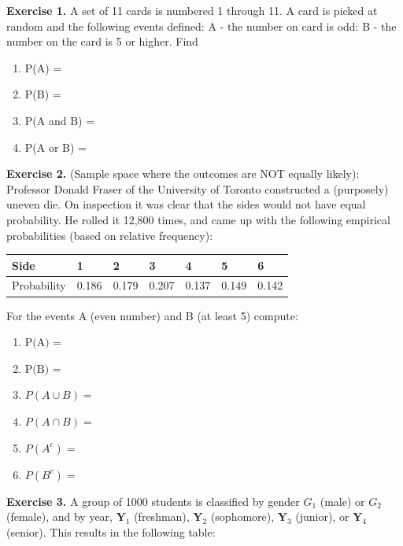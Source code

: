 \documentclass[
]{book}
\begin{document}
\textbf{Exercise 1.} A set of 11 cards is numbered 1 through 11. A card is picked at random and the following events defined: A - the number on card is odd: B - the number on the card is 5 or higher. Find

\begin{enumerate}
\def\labelenumi{\alph{enumi})}
\item
  P(A) =
\item
  P(B) =
\item
  P(A and B) =
\item
  P(A or B) =
\end{enumerate}

\textbf{Exercise 2.} (Sample space where the outcomes are NOT equally likely): Professor Donald Fraser of the University of Toronto constructed a (purposely) uneven die. On inspection it was clear that the sides would not have equal probability. He rolled it 12,800 times, and came up with the following empirical probabilities (based on relative frequency):

\begin{longtable}[]{@{}lllllll@{}}
\toprule\noalign{}
Side & 1 & 2 & 3 & 4 & 5 & 6 \\
\midrule\noalign{}
\endhead
\bottomrule\noalign{}
\endlastfoot
Probability & 0.186 & 0.179 & 0.207 & 0.137 & 0.149 & 0.142 \\
\end{longtable}

For the events A (even number) and B (at least 5) compute:

\begin{enumerate}
\def\labelenumi{\alph{enumi})}
\item
  \(\text{P(A) =}\)
\item
  \(\text{P(B) =}\)
\item
  \(P(A \cup B)=\)
\item
  \(P(A\cap B) =\)
\item
  \(P(A^c) =\)
\item
  \(P(B^c) =\)
\end{enumerate}

\textbf{Exercise 3.} A group of 1000 students is classified by gender \(G_1\) (male) or \(G_2\) (female), and by year, \(\textbf{Y}_1\) (freshman), \(\textbf{Y}_2\) (sophomore), \(\textbf{Y}_3\) (junior), or \(\textbf{Y}_4\) (senior). This results in the following table:
\end{document}
